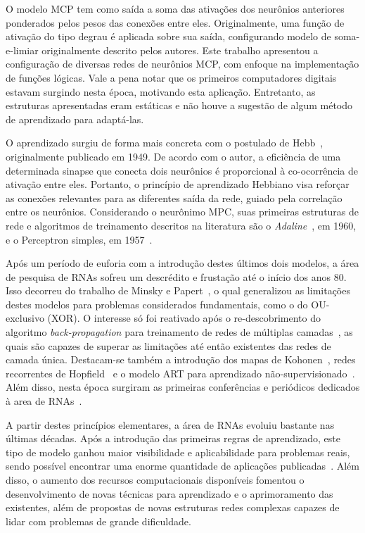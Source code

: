 \documentclass[conference]{IEEEtran}
\begin{document}
	O modelo MCP tem como saída a soma das ativações dos neurônios anteriores ponderados pelos pesos das conexões entre eles. Originalmente, uma função de ativação do tipo degrau é aplicada sobre sua saída, configurando modelo de soma-e-limiar originalmente descrito pelos autores. Este trabalho apresentou a configuração de diversas redes de neurônios MCP, com enfoque na implementação de funções lógicas. Vale a pena notar que os primeiros computadores digitais estavam surgindo nesta época, motivando esta aplicação. Entretanto, as estruturas apresentadas eram estáticas e não houve a sugestão de algum método de aprendizado para adaptá-las.
	
	O aprendizado surgiu de forma mais concreta com o postulado de Hebb~\cite{hebb2005organization}, originalmente publicado em 1949. De acordo com o autor, a eficiência de uma determinada sinapse que conecta dois neurônios é proporcional à co-ocorrência de ativação entre eles. Portanto, o princípio de aprendizado Hebbiano visa reforçar as conexões relevantes para as diferentes saída da rede, guiado pela correlação entre os neurônios. Considerando o neurônimo MPC, suas primeiras estruturas de rede e algoritmos de treinamento descritos na literatura são o \textit{Adaline}~\cite{widrow1960adaptive}, em 1960, e o Perceptron simples, em 1957~\cite{rosenblatt1957perceptron}.
	
	Após um período de euforia com a introdução destes últimos dois modelos, a área de pesquisa de RNAs sofreu um descrédito e frustação até o início dos anos 80. Isso decorreu  do trabalho de Minsky e Papert~\cite{minsky1969introduction}, o qual generalizou as limitações destes modelos para problemas considerados fundamentais, como o do OU-exclusivo (XOR). O interesse só foi reativado após o re-descobrimento do algoritmo \textit{back-propagation} para treinamento de redes de múltiplas camadas~\cite{rumelhart1985learning}, as quais são capazes de superar as limitações até então existentes das redes de camada única. Destacam-se também a introdução dos mapas de Kohonen~\cite{kohonen1982self}, redes recorrentes de Hopfield~\cite{hopfield1982neural} e o modelo ART para aprendizado não-supervisionado~\cite{carpenter1987massively}. Além disso, nesta época surgiram as primeiras conferências e periódicos dedicados à area de RNAs~\cite{macukow2016neural}.
	
	A partir destes princípios elementares, a área de RNAs evoluiu bastante nas últimas décadas. Após a introdução das primeiras regras de aprendizado, este tipo de modelo ganhou maior visibilidade e aplicabilidade para problemas reais, sendo possível encontrar uma enorme quantidade de aplicações publicadas~\cite{abiodun2018state}. Além disso, o aumento dos recursos computacionais disponíveis fomentou o desenvolvimento de novas técnicas para aprendizado e o aprimoramento das existentes, além de propostas de novas estruturas redes complexas capazes de lidar com problemas de grande dificuldade.
	
\end{document}
